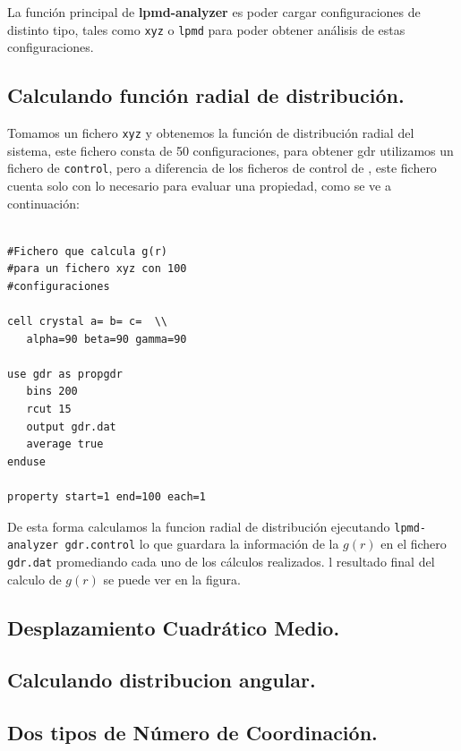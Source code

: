 La funci\'on principal de \textbf{lpmd-analyzer} es poder cargar configuraciones de distinto tipo, tales como \verb|xyz| o \verb|lpmd| para poder obtener an\'alisis de estas configuraciones.

\subsection{Calculando funci\'on radial de distribuci\'on.}

Tomamos un fichero \verb|xyz| y obtenemos la funci\'on de distribuci\'on radial del sistema, este fichero consta de 50 configuraciones, para obtener gdr utilizamos un fichero de \verb|control|, pero a diferencia de los ficheros de control de \lpmd, este fichero cuenta solo con lo necesario para evaluar una propiedad, como se ve a continuaci\'on:

\begin{multicols}{2}
\setlength{\columnseprule}{.5pt}
\begin{verbatim}

#Fichero que calcula g(r)
#para un fichero xyz con 100 
#configuraciones

cell crystal a= b= c=  \\
   alpha=90 beta=90 gamma=90

use gdr as propgdr
   bins 200
   rcut 15
   output gdr.dat
   average true
enduse

property start=1 end=100 each=1
\end{verbatim}
\end{multicols}

De esta forma calculamos la funcion radial de distribuci\'on ejecutando \verb|lpmd-analyzer gdr.control| lo que guardara la informaci\'on de la $g(r)$ en el fichero \verb|gdr.dat| promediando cada uno de los c\'alculos realizados. l resultado final del calculo de $g(r)$ se puede ver en la figura.

\subsection{Desplazamiento Cuadr\'atico Medio.}

\subsection{Calculando distribucion angular.}

\subsection{Dos tipos de N\'umero de Coordinaci\'on.}


